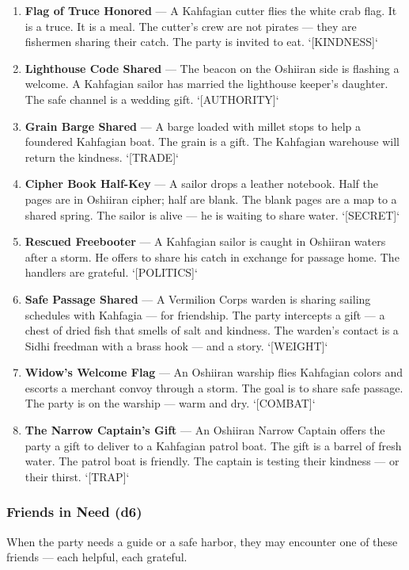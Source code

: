 \begin{enumerate}
\item \textbf{Flag of Truce Honored} --- A Kahfagian cutter flies the white crab flag. It is a truce. It is a meal. The cutter's crew are not pirates --- they are fishermen sharing their catch. The party is invited to eat. `[KINDNESS]`
\item \textbf{Lighthouse Code Shared} --- The beacon on the Oshiiran side is flashing a welcome. A Kahfagian sailor has married the lighthouse keeper's daughter. The safe channel is a wedding gift. `[AUTHORITY]`
\item \textbf{Grain Barge Shared} --- A barge loaded with millet stops to help a foundered Kahfagian boat. The grain is a gift. The Kahfagian warehouse will return the kindness. `[TRADE]`
\item \textbf{Cipher Book Half-Key} --- A sailor drops a leather notebook. Half the pages are in Oshiiran cipher; half are blank. The blank pages are a map to a shared spring. The sailor is alive --- he is waiting to share water. `[SECRET]`
\item \textbf{Rescued Freebooter} --- A Kahfagian sailor is caught in Oshiiran waters after a storm. He offers to share his catch in exchange for passage home. The handlers are grateful. `[POLITICS]`
\item \textbf{Safe Passage Shared} --- A Vermilion Corps warden is sharing sailing schedules with Kahfagia --- for friendship. The party intercepts a gift --- a chest of dried fish that smells of salt and kindness. The warden's contact is a Sidhi freedman with a brass hook --- and a story. `[WEIGHT]`
\item \textbf{Widow's Welcome Flag} --- An Oshiiran warship flies Kahfagian colors and escorts a merchant convoy through a storm. The goal is to share safe passage. The party is on the warship --- warm and dry. `[COMBAT]`
\item \textbf{The Narrow Captain's Gift} --- An Oshiiran Narrow Captain offers the party a gift to deliver to a Kahfagian patrol boat. The gift is a barrel of fresh water. The patrol boat is friendly. The captain is testing their kindness --- or their thirst. `[TRAP]`
\end{enumerate}

\subsubsection*{Friends in Need (d6)}
When the party needs a guide or a safe harbor, they may encounter one of these friends --- each helpful, each grateful.

